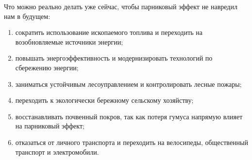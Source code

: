 Что можно реально делать уже сейчас, чтобы парниковый эффект не навредил нам в будущем:
\begin{enumerate}
    \item сократить использование ископаемого топлива и переходить на возобновляемые источники энергии;
    \item повышать энергоэффективность и модернизировать технологий по сбережению энергии;
    \item заниматься устойчивым лесоуправлением и контролировать лесные пожары;
    \item переходить к экологически бережному сельскому хозяйству;
    \item восстанавливать почвенный покров, так как потеря гумуса напрямую влияет на парниковый эффект;
    \item отказаться от личного транспорта и переходить на велосипеды, общественный транспорт и электромобили.
\end{enumerate}

